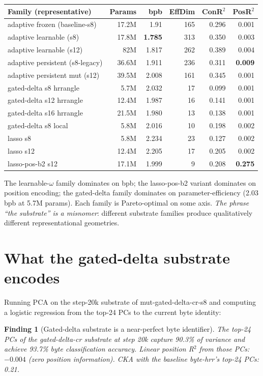 \documentclass[11pt,openany]{book}
\newtheorem{finding}{Finding}[chapter]
\begin{document}
\begin{longtable}{lrrrrr}
\toprule
Family (representative) & Params & bpb & EffDim & ConR$^2$ & PosR$^2$ \\
\midrule
adaptive frozen (baseline-s8) & 17.2M & 1.91 & 165 & 0.296 & 0.001 \\
adaptive learnable (s8) & 17.8M & \textbf{1.785} & 313 & 0.350 & 0.003 \\
adaptive learnable (s12) & 82M & 1.817 & 262 & 0.389 & 0.004 \\
adaptive persistent (s8-legacy) & 36.6M & 1.911 & 236 & 0.311 & \textbf{0.009} \\
adaptive persistent mut (s12) & 39.5M & 2.008 & 161 & 0.345 & 0.001 \\
gated-delta s8 hrrangle & 5.7M & 2.032 & 17 & 0.099 & 0.001 \\
gated-delta s12 hrrangle & 12.4M & 1.987 & 16 & 0.141 & 0.001 \\
gated-delta s16 hrrangle & 21.5M & 1.980 & 13 & 0.138 & 0.001 \\
gated-delta s8 local & 5.8M & 2.016 & 10 & 0.198 & 0.002 \\
lasso s8 & 5.8M & 2.234 & 23 & 0.127 & 0.002 \\
lasso s12 & 12.4M & 2.205 & 17 & 0.205 & 0.002 \\
lasso-pos-b2 s12 & 17.1M & 1.999 & 9 & 0.208 & \textbf{0.275} \\
\bottomrule
\end{longtable}

The learnable-$\omega$ family dominates on bpb; the lasso-pos-b2
variant dominates on position encoding; the gated-delta family
dominates on parameter-efficiency (2.03 bpb at 5.7M params). Each
family is Pareto-optimal on some axis. \emph{The phrase ``the
substrate'' is a misnomer}: different substrate families produce
qualitatively different representational geometries.

\section{What the gated-delta substrate encodes}

Running PCA on the step-20k substrate of mut-gated-delta-cr-s8 and
computing a logistic regression from the top-24 PCs to the current
byte identity:

\begin{finding}[Gated-delta substrate is a near-perfect byte identifier]
The top-24 PCs of the gated-delta-cr substrate at step 20k capture
90.3\% of variance and achieve 93.7\% byte classification accuracy.
Linear position R$^2$ from those PCs: $-0.004$ (zero position
information). CKA with the baseline byte-hrr's top-24 PCs: 0.21.
\end{finding}
\end{document}
